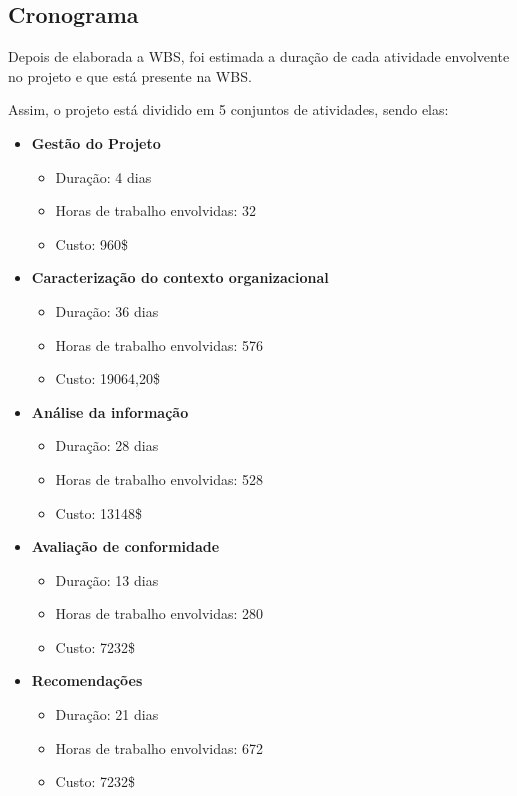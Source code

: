\subsection{Cronograma}

Depois de elaborada a WBS, foi estimada a duração de cada atividade envolvente no projeto e que está presente na WBS.

Assim, o projeto está dividido em 5 conjuntos de atividades, sendo elas:

\begin{itemize}
	\item \textbf{Gestão do Projeto}
		\begin{itemize}
			\item Duração: 4 dias
			\item Horas de trabalho envolvidas: 32
			\item Custo: 960\$
		\end{itemize}
	\item \textbf{Caracterização do contexto organizacional}
		\begin{itemize}
			\item Duração: 36 dias
			\item Horas de trabalho envolvidas: 576
			\item Custo: 19064,20\$
		\end{itemize}
	\item \textbf{Análise da informação}
		\begin{itemize}
			\item Duração: 28 dias
			\item Horas de trabalho envolvidas: 528
			\item Custo: 13148\$
		\end{itemize}
	\item \textbf{Avaliação de conformidade}
		\begin{itemize}
			\item Duração: 13 dias
			\item Horas de trabalho envolvidas: 280
			\item Custo: 7232\$
    \end{itemize}
    \item \textbf{Recomendações}
		\begin{itemize}
      \item Duração: 21 dias
      \item Horas de trabalho envolvidas: 672
			\item Custo: 7232\$
		\end{itemize}
\end{itemize}
